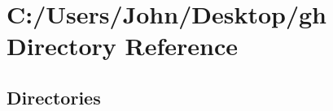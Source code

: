 \section{C\+:/\+Users/\+John/\+Desktop/gh Directory Reference}
\label{dir_4b1f390c7c44d764c1f37b0d67fdc23b}
\subsection*{Directories}
\begin{DoxyCompactItemize}
\end{DoxyCompactItemize}
